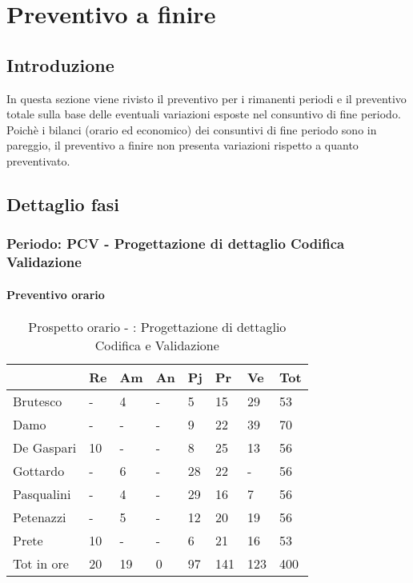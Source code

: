 \section {Preventivo a finire}
	\subsection {Introduzione}
	In questa sezione viene rivisto il preventivo per i rimanenti periodi e il preventivo totale sulla base delle eventuali variazioni esposte nel consuntivo di fine periodo.
	Poichè i bilanci (orario ed economico) dei consuntivi di fine periodo sono in pareggio, il preventivo a finire non presenta variazioni rispetto a quanto preventivato.
	\subsection{Dettaglio fasi}
		\subsubsection {Periodo: PCV - Progettazione di dettaglio Codifica Validazione}
			\paragraph{Preventivo orario}
											\begin{table}[h] \begin{center} \begin{tabular}{llllllll}															
											\toprule															
												&	Re	&	Am	&	An	&	Pj	&	Pr	&	Ve	&	Tot	\\
											\midrule															
											Brutesco	&	-	&	4	&	-	&	5	&	15	&	29	&	53	\\
											Damo		&	-	&	-	&	-	&	9	&	22	&	39	&	70	\\
											De Gaspari	&	10	&	-	&	-	&	8	&	25	&	13	&	56	\\
											Gottardo	&	-	&	6	&	-	&	28	&	22	&	-	&	56	\\
											Pasqualini	&	-	&	4	&	-	&	29	&	16	&	7	&	56	\\
											Petenazzi	&	-	&	5	&	-	&	12	&	20	&	19	&	56	\\
											Prete	&	10	&	-	&	-	&	6	&	21	&	16	&	53	\\
											\midrule															
											Tot in ore	&	20	&	19	&	0	&	97	&	141	&	123	&	400	\\
											\bottomrule															
											\end{tabular} \end{center} \caption{Prospetto orario - :															
											Progettazione di dettaglio Codifica e Validazione															
											}\label{tab:h_An		} \end{table}		

